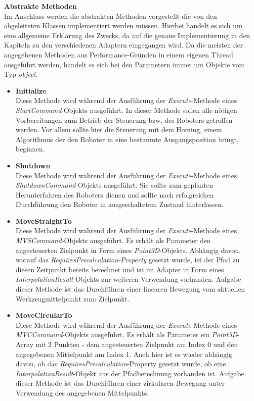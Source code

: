 \textbf{Abstrakte Methoden}\\
Im Anschluss werden die abstrakten Methoden vorgestellt die von den abgeleiteten Klassen implementiert werden müssen. Hierbei handelt es sich um eine allgemeine Erklärung des Zwecks, da auf die genaue Implementierung in den Kapiteln zu den verschiedenen Adaptern eingegangen wird. Da die meisten der angegebenen Methoden aus Performance-Gründen in einem eigenen Thread ausgeführt werden, handelt es sich bei den Parametern immer um Objekte vom Typ \textit{object}. 
\begin{itemize}
\item \textbf{Initialize}\\
Diese Methode wird während der Ausführung der \textit{Execute}-Methode eines \textit{StartCommand}-Objekts ausgeführt. In dieser Methode sollen alle nötigen Vorbereitungen zum Betrieb der Steuerung bzw. des Roboters getroffen werden. Vor allem sollte hier die Steuerung mit dem Homing, einem Algorithmus der den Roboter in eine bestimmte Ausgangsposition bringt, beginnen.
\item \textbf{Shutdown}\\
Diese Methode wird während der Ausführung der \textit{Execute}-Methode eines \textit{ShutdownCommand}-Objekts ausgeführt. Sie sollte zum geplanten Herunterfahren des Roboters dienen und sollte nach erfolgreichen Durchführung den Roboter in ausgeschaltetem Zustand hinterlassen.
\item \textbf{MoveStraightTo}\\
Diese Methode wird während der Ausführung der \textit{Execute}-Methode eines \textit{MVSCommand}-Objekts ausgeführt. Es erhält als Parameter den angesteuerten Zielpunkt in Form eines \textit{Point3D}-Objekts. Abhängig davon, worauf das \textit{RequiresPrecalculation-Property} gesetzt wurde, ist der Pfad zu diesen Zeitpunkt bereits berechnet und ist im Adapter in Form eines \textit{InterpolationResult}-Objekts zur weiteren Verwendung vorhanden. Aufgabe dieser Methode ist das Durchführen einer linearen Bewegung vom aktuellen Werkzeugmittelpunkt zum Zielpunkt.
\item \textbf{MoveCircularTo}\\
Diese Methode wird während der Ausführung der \textit{Execute}-Methode eines \textit{MVCCommand}-Objekts ausgeführt. Es erhält als Parameter ein \textit{Point3D}-Array mit 2 Punkten - dem angesteuerten Zielpunkt am Index 0 und den angegebenen Mittelpunkt am Index 1. Auch hier ist es wieder abhängig davon, ob das \textit{RequiresPrecalculation}-Property gesetzt wurde, ob eine \textit{InterpolationResult}-Objekt aus der Pfadberechnung vorhanden ist. Aufgabe dieser Methode ist das Durchführen einer zirkularen Bewegung unter Verwendung des angegebenen Mittelpunkts.

\end{itemize}
